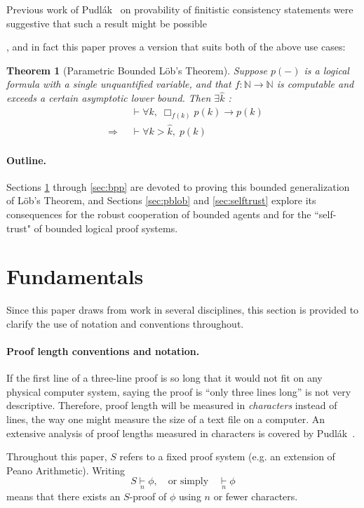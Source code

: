 \documentclass[onecolumn]{miri-tech-article}
\newcommand{\bred}[1]{{\color{red}{#1}}}
\newtheorem*{theorem*}{Theorem}
\numberwithin{equation}{section}
\theoremstyle{definition}
\newcommand{\NN}{\mathbb{N}}
\newcommand{\proves}[1]{\underset{#1}{\vdash}}
\newcommand{\bx}[1]{\Box_{#1}}
\renewcommand{\implies}{\rightarrow}
\renewcommand{\to}{\rightarrow}
\newcommand{\Implies}{\;\;\Rightarrow\;\;}
\renewcommand{\-}{^{-1}}
\begin{document}
Previous work of Pudl\'{a}k~\cite{Pudlak:1998} on provability of finitistic consistency statements were suggestive that such a result might be possible

\bred{elaborate}, and in fact this paper proves a version that suits both of the above use cases:

\begin{theorem*}[Parametric Bounded L\"{o}b's Theorem]
Suppose $p(-)$ is a logical formula with a single unquantified variable, and that $f:\NN \to \NN$ is computable and  exceeds a certain asymptotic lower bound.  Then $\exists\hat k$ :
\begin{align*}
             &\proves{} \forall k,\; \bx{f(k)}p(k) \implies p(k)\\
\Implies &\proves{} \forall k>\hat k, \; p(k)
\end{align*}
\end{theorem*}

\paragraph{Outline.} Sections \ref{sec:fund} through \ref{sec:bpp} are devoted to proving this bounded generalization of L\"{o}b's Theorem, and Sections \ref{sec:pblob} and \ref{sec:selftrust} explore its consequences for the robust cooperation of bounded agents and for the ``self-trust" of bounded logical proof systems.

\section{Fundamentals}\label{sec:fund}

Since this paper draws from work in several disciplines, this section is provided to clarify the use of notation and conventions throughout.

\paragraph{Proof length conventions and notation.}
If the first line of a three-line proof is so long that it would not fit on any physical computer system, saying the proof is ``only three lines long'' is not very descriptive.  Therefore, proof length will be measured in {\em characters} instead of lines, the way one might measure the size of a text file on a computer.  An extensive analysis of proof lengths measured in characters is covered by Pudl\'{a}k~\cite{Pudlak:1998}.

Throughout this paper, $S$ refers to a fixed proof system (e.g. an extension of Peano Arithmetic).  Writing
$$S \proves{n} \phi, \quad \text{or simply} \quad \proves{n} \phi$$
means that there exists an $S$-proof of $\phi$ using $n$ or fewer characters.  
\end{document}
